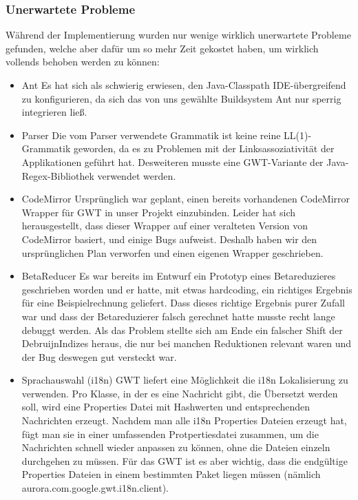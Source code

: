\documentclass[parskip=full,11pt,twoside]{scrartcl}
\begin{document}
\subsubsection{Unerwartete Probleme}
Während der Implementierung wurden nur wenige wirklich unerwartete Probleme gefunden, welche aber dafür um so mehr Zeit gekostet haben, um wirklich vollends behoben werden zu können:
\begin{itemize}
    \item Ant
        \newline
        Es hat sich als schwierig erwiesen, den Java-Classpath IDE-übergreifend zu konfigurieren,
		da sich das von uns gewählte Buildsystem Ant nur sperrig integrieren ließ.

    \item Parser
        \newline
		Die vom Parser verwendete Grammatik ist keine reine LL(1)-Grammatik geworden, da es zu Problemen mit der
		Linksassoziativität der Applikationen geführt hat.
		Desweiteren musste eine GWT-Variante der Java-Regex-Bibliothek verwendet werden.
    \item CodeMirror
        \newline
        Ursprünglich war geplant, einen bereits vorhandenen CodeMirror Wrapper für GWT in unser Projekt einzubinden.
        Leider hat sich herausgestellt, dass dieser Wrapper auf einer veralteten Version von CodeMirror basiert, und einige Bugs aufweist.
        Deshalb haben wir den ursprünglichen Plan verworfen und einen eigenen Wrapper geschrieben.
    \item BetaReducer
    \newline
Es war bereits im Entwurf ein Prototyp eines Betareduzieres geschrieben worden und er hatte, mit etwas hardcoding, ein richtiges Ergebnis für eine Beispielrechnung geliefert.
Dass dieses richtige Ergebnis purer Zufall war und dass der Betareduzierer falsch gerechnet hatte musste recht lange debuggt werden.
Als das Problem stellte sich am Ende ein falscher Shift der DebruijnIndizes heraus, die nur bei manchen Reduktionen relevant waren und der Bug deswegen gut versteckt war.

    \item Sprachauswahl (i18n)
    \newline
GWT liefert eine Möglichkeit die i18n Lokalisierung zu verwenden. Pro Klasse, in der es eine Nachricht gibt, die Übersetzt werden soll, wird eine Properties Datei mit Hashwerten und entsprechenden Nachrichten erzeugt. Nachdem man alle i18n Properties Dateien erzeugt hat, fügt man  sie in einer umfassenden Protpertiesdatei zusammen, um die Nachrichten schnell wieder anpassen zu können, ohne die Dateien einzeln durchgehen zu müssen. Für das GWT ist es aber wichtig, dass die endgültige Properties Dateien in einem bestimmten Paket liegen müssen (nämlich aurora.com.google.gwt.i18n.client).


\end{itemize}
\end{document}
